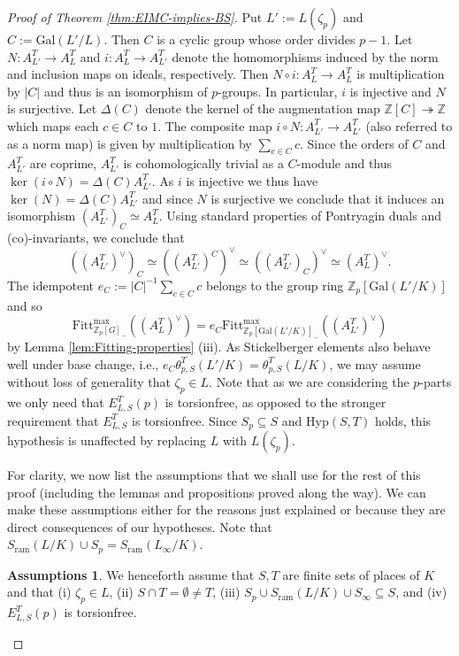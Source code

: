 \documentclass[12pt]{amsart}
\theoremstyle{plain}
\theoremstyle{remark}
\theoremstyle{definition}
\newtheorem*{assumptions*}{Assumptions}
\numberwithin{equation}{section}
\begin{document}
{\begin{proof}[Proof of Theorem \ref{thm:EIMC-implies-BS}]
Put $L' := L(\zeta_{p})$ and $C := {\mathrm{Gal}}(L'/L)$. 
Then $C$ is a cyclic group whose order divides $p-1$.
Let $N:A_{L'}^{T} \rightarrow A_{L}^{T}$ and $i:A_{L}^{T} \rightarrow A_{L'}^{T}$ 
denote the homomorphisms induced by the norm and inclusion maps on ideals, respectively.
Then $N \circ i : A_{L}^{T} \rightarrow A_{L}^{T}$ is multiplication by $|C|$ and thus is an isomorphism of $p$-groups.
In particular, $i$ is injective and $N$ is surjective. 
Let $\Delta(C)$ denote the kernel of the augmentation map ${\mathbb{Z}}[C] \twoheadrightarrow {\mathbb{Z}}$ which maps each $c \in C$ to $1$. 
The composite map $i \circ N: A^{T}_{L'} \rightarrow A^{T}_{L'}$
(also referred to as a norm map) is given by multiplication by $\sum_{c \in C} c$.
Since the orders of $C$ and $A^{T}_{L'}$ are coprime, $A^{T}_{L'}$ is cohomologically trivial as a $C$-module and thus
$\ker(i \circ N) =  \Delta(C) A_{L'}^{T}$. 
As $i$ is injective we thus have  $\ker(N) =  \Delta(C) A_{L'}^{T}$ and since $N$ is surjective we conclude that it induces an isomorphism
 $(A_{L'}^{T})_{C} \simeq A_{L}^{T}$.
Using standard properties of Pontryagin duals and (co)-invariants, we conclude that 
\[
((A_{L'}^{T})^{\vee})_{C} \simeq ((A_{L'}^{T})^{C})^{\vee} \simeq ((A_{L'}^{T})_{C})^{\vee} \simeq (A_{L}^{T})^{\vee}.
\]
The idempotent $e_{C} := |C|^{-1} \sum_{c \in C} c$ belongs to the group ring ${\mathbb{Z}}_{p}[{\mathrm{Gal}}(L'/K)]$ and so
\[
{\mathrm{Fitt}}^{\max}_{{\mathbb{Z}}_{p}[G]_{-}}((A_{L}^{T})^{\vee}) = e_{C} {\mathrm{Fitt}}^{\max}_{{\mathbb{Z}}_{p}[{\mathrm{Gal}}(L'/K)]_{-}}((A_{L'}^{T})^{\vee})
\]
by Lemma \ref{lem:Fitting-properties} (iii).
As Stickelberger elements also behave well under base change, i.e., $e_{C} \theta_{p,S}^{T}(L'/K) = \theta_{p,S}^{T}(L/K)$, we may assume without loss of generality that $\zeta_{p} \in L$.
Note that as we are considering the $p$-parts we only need that $E^{T}_{L,S}(p)$ is torsionfree,
as opposed to the stronger requirement that $E^{T}_{L,S}$ is torsionfree.
Since $S_{p} \subseteq S$ and ${\mathrm{Hyp}}(S,T)$ holds, this hypothesis is unaffected by replacing $L$ with $L(\zeta_{p})$.

For clarity, we now list the assumptions that we shall use for the rest of this proof 
(including the lemmas and propositions proved along the way).
We can make these assumptions either for the reasons just explained or because they are direct consequences 
of our hypotheses. Note that $S_{\mathrm{ram}}(L/K) \cup S_{p} = S_{\mathrm{ram}}(L_{\infty}/K)$.

\begin{assumptions*}
We henceforth assume that $S,T$ are finite sets of places of $K$ and that
(i) $\zeta_{p} \in L$, (ii) $S \cap T = \emptyset \neq T$, (iii)  $S_{p} \cup S_{\mathrm{ram}}(L/K) \cup S_{\infty} \subseteq S$,
and (iv) $E^{T}_{L,S}(p)$ is torsionfree.
\end{assumptions*}


\end{proof}}
\end{document}
